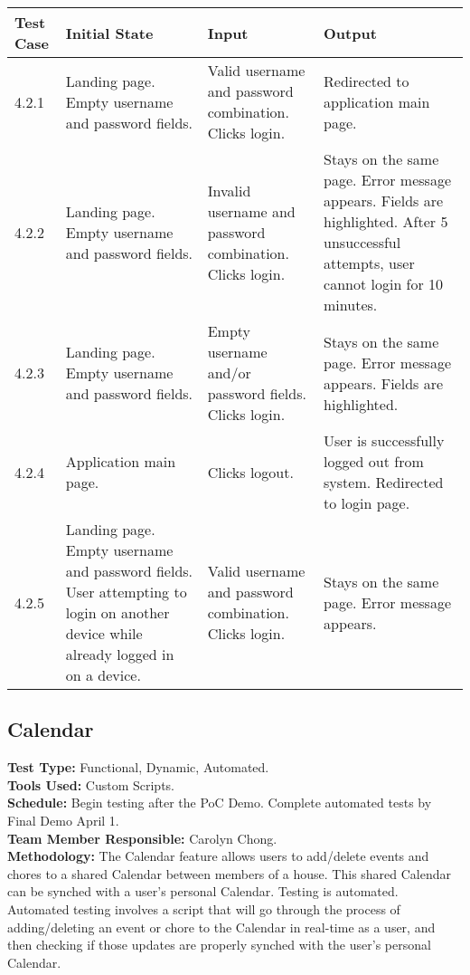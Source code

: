 \documentclass[12pt]{article}
\begin{document}
\begin{longtable}{|p{2cm}|p{3cm}|p{5cm}|p{5cm}|}
\hline
\textbf{Test Case}  & \textbf{Initial State} & \textbf{Input} & \textbf{Output} \\ \hline
4.2.1 & Landing page. Empty username and password fields. & Valid username and password combination. Clicks login. & Redirected to application main page. \\ 
\hline
4.2.2 & Landing page. Empty username and password fields. & Invalid username and password combination. Clicks login. & Stays on the same page. Error message appears. Fields are highlighted. After 5 unsuccessful attempts, user cannot login for 10 minutes. \\
\hline
4.2.3 & Landing page. Empty username and password fields. & Empty username and/or password fields. Clicks login. & Stays on the same page. Error message appears. Fields are highlighted. \\
\hline
4.2.4 & Application main page. & Clicks logout. & User is successfully logged out from system. Redirected to login page. \\
\hline
4.2.5 & Landing page. Empty username and password fields. User attempting to login on another device while already logged in on a device. & Valid username and password combination. Clicks login. & Stays on the same page. Error message appears. \\ 
\hline
\end{longtable}



\subsection{Calendar}
\textbf{Test Type:} Functional, Dynamic, Automated. \\
\textbf{Tools Used:} Custom Scripts. \\
\textbf{Schedule:} Begin testing after the PoC Demo. Complete automated tests by Final Demo April 1. \\
\textbf{Team Member Responsible:} Carolyn Chong. \\
\textbf{Methodology:} The Calendar feature allows users to add/delete events and chores to a shared Calendar between members of a house. This shared Calendar can be synched with a user's personal Calendar. Testing is automated. Automated testing involves a script that will go through the process of adding/deleting an event or chore to the Calendar in real-time as a user, and then checking if those updates are properly synched with the user's personal Calendar. 
\end{document}
